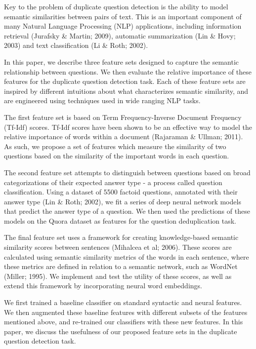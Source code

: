 \documentclass[letterpaper, 10 pt, conference]{ieeeconf}  %
\begin{document}
Key to the problem of duplicate question detection is the ability to model semantic similarities between pairs of text. This is an important component of many Natural Language Processing (NLP) applications, including information retrieval (Jurafsky \& Martin; 2009), automatic summarization (Lin \& Hovy; 2003) and text classification (Li \& Roth; 2002). 

In this paper, we describe three feature sets designed to capture  the semantic relationship between questions. We then evaluate the relative importance of these features for the duplicate question detection task. Each of these feature sets are inspired by different intuitions about what characterizes semantic similarity, and are engineered using techniques used in wide ranging NLP tasks. 

The first feature set is based on Term Frequency-Inverse Document Frequency (Tf-Idf) scores. Tf-Idf scores have been shown to be an effective way to model the relative importance of words within a document (Rajaraman \& Ullman; 2011). As such, we propose a set of features which measure the similarity of two questions based on the similarity of the important words in each question.

The second feature set attempts to distinguish between questions based on broad categorizations of their expected answer type - a process called question classification. Using a dataset of 5500 factoid questions, annotated with their answer type (Lin \& Roth; 2002), we fit a series of deep neural network models that predict the answer type of a question. We then used the predictions of these models on the Quora dataset as features for the question deduplication task.

The final feature set uses a framework for creating knowledge-based  semantic similarity scores between sentences (Mihalcea et al; 2006). These scores are calculated using semantic similarity metrics of the words in each sentence, where these metrics are defined in relation to a semantic network, such as WordNet (Miller; 1995). We implement and test the utility of these scores, as well as extend this framework by incorporating neural word embeddings.

We first trained a baseline classifier on standard syntactic and neural features. We then augmented these baseline features with different subsets of the features mentioned above, and re-trained our classifiers with these new features. In this paper, we discuss the usefulness of our proposed feature sets in the duplicate question detection task.
\end{document}
